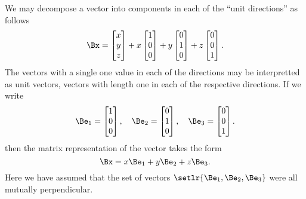 We may decompose a vector into components in each of the ``unit directions'' as follows
\begin{equation}\label{eqn:multivector:160}
\Bx =
\begin{bmatrix}
x \\
y \\
z
\end{bmatrix}
+
x
\begin{bmatrix}
1 \\
0 \\
0 \\
\end{bmatrix}
+
y
\begin{bmatrix}
0 \\
1 \\
0 \\
\end{bmatrix}
+
z
\begin{bmatrix}
0 \\
0 \\
1 \\
\end{bmatrix}.
\end{equation}
The vectors with a single one value in each of the directions may be interpretted as unit vectors, vectors with length one in each of the respective directions.
If we write
\begin{equation}\label{eqn:prerequisites:20}
\Be_1 =
\begin{bmatrix}
1 \\
0 \\
0 \\
\end{bmatrix},\quad
\Be_2 =
\begin{bmatrix}
0 \\
1 \\
0 \\
\end{bmatrix},\quad
\Be_3 =
\begin{bmatrix}
0 \\
0 \\
1 \\
\end{bmatrix}.
\end{equation}
then the matrix representation of the vector takes the form
\begin{equation}\label{eqn:prerequisites:40}
\Bx = x \Be_1 + y \Be_2 + z \Be_3.
\end{equation}
Here we have assumed that the set of vectors
\( \setlr{ \Be_1, \Be_2, \Be_3 } \) were all mutually perpendicular.
